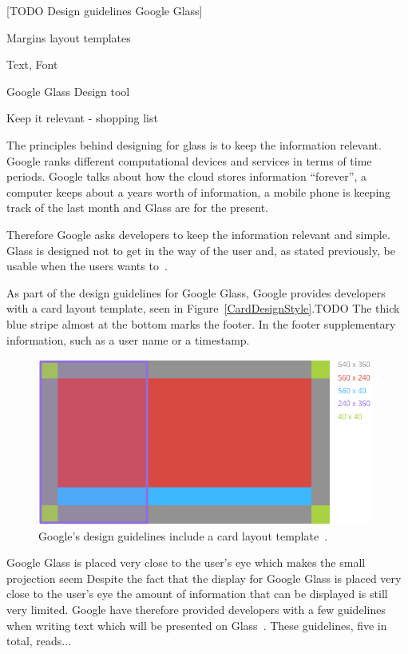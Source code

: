 [TODO Design guidelines Google Glass]

Margins layout templates

Text, Font

Google Glass Design tool

Keep it relevant  - shopping list

The principles behind designing for glass is to keep the information relevant. Google ranks different computational devices and services in terms of time periods. Google talks about how the cloud stores information ``forever'', a computer keeps about a years worth of information, a mobile phone is keeping track of the last month and Glass are for the present.

Therefore Google asks developers to keep the information relevant and simple. Glass is designed not to get in the way of the user and, as stated previously, be usable when the users wants to~\cite{glassDesignPrinciples}.

As part of the design guidelines for Google Glass, Google provides developers with a card layout template, seen in Figure~\ref{CardDesignStyle}.TODO The thick blue stripe almost at the bottom marks the footer. In the footer supplementary information, such as a user name or a timestamp.

	\begin{figure}[ht!]
		\centering
		\includegraphics[width=110mm]{images/standard-template}
		\caption{Google's design guidelines include a card layout template~\cite{glassDesignStyle}.}
		\label{GlassDesignStyle}
	\end{figure}

Google Glass is placed very close to the user's eye which makes the small projection seem Despite the fact that the display for Google Glass is placed very close to the user's eye the amount of information that can be displayed is still very limited. Google have therefore provided developers with a few guidelines when writing text which will be presented on Glass~\cite{glassDesignStyle}. These guidelines, five in total, reads...

